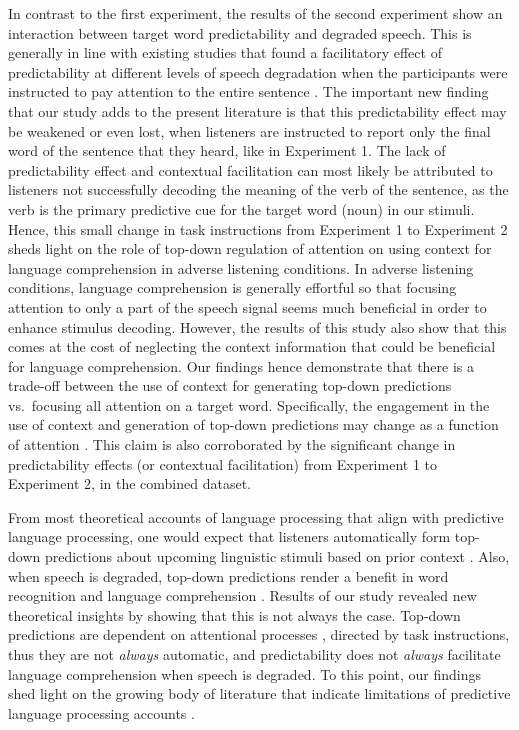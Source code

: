 \documentclass[a4paper, nobind]{templates/ociamthesis}
\begin{document}
In contrast to the first experiment, the results of the second experiment show an interaction between target word predictability and degraded speech.
This is generally in line with existing studies that found a facilitatory effect of predictability at different levels of speech degradation when the participants were instructed to pay attention to the entire sentence \autocites[e.g., at 4 channels or 8 channels noise vocoded speech,][]{Obleser2007,Obleser2010}.
The important new finding that our study adds to the present literature is that this predictability effect may be weakened or even lost, when listeners are instructed to report only the final word of the sentence that they heard, like in Experiment 1.
The lack of predictability effect and contextual facilitation can most likely be attributed to listeners not successfully decoding the meaning of the verb of the sentence, as the verb is the primary predictive cue for the target word (noun) in our stimuli.
Hence, this small change in task instructions from Experiment 1 to Experiment 2 sheds light on the role of top-down regulation of attention on using context for language comprehension in adverse listening conditions.
In adverse listening conditions, language comprehension is generally effortful so that focusing attention to only a part of the speech signal seems much beneficial in order to enhance stimulus decoding.
However, the results of this study also show that this comes at the cost of neglecting the context information that could be beneficial for language comprehension.
Our findings hence demonstrate that there is a trade-off between the use of context for generating top-down predictions vs.~focusing all attention on a target word.
Specifically, the engagement in the use of context and generation of top-down predictions may change as a function of attention \autocite[see also,][]{Li2014}.
This claim is also corroborated by the significant change in predictability effects (or contextual facilitation) from Experiment 1 to Experiment 2, in the combined dataset.

From most theoretical accounts of language processing that align with predictive language processing, one would expect that listeners automatically form top-down predictions about upcoming linguistic stimuli based on prior context \autocite{Mcclelland1986,Kuperberg2016,Norris2016,Pickering2018,Friston2020}.
Also, when speech is degraded, top-down predictions render a benefit in word recognition and language comprehension \autocites[e.g.,][]{Sheldon2008a,Sheldon2008b,Corps2020}.
Results of our study revealed new theoretical insights by showing that this is not always the case.
Top-down predictions are dependent on attentional processes \autocite[see also,][]{Kok2012}, directed by task instructions, thus they are not \emph{always} automatic, and predictability does not \emph{always} facilitate language comprehension when speech is degraded.
To this point, our findings shed light on the growing body of literature that indicate limitations of predictive language processing accounts \autocite{Mishra2012,Huettig2016,Nieuwland2018,Huettig2019}.
\end{document}
